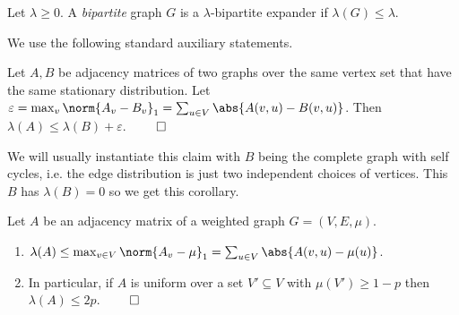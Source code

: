 \begin{definition}
    Let \(\lambda \geq 0\). A \emph{bipartite} graph \(G\) is a \(\lambda\)-bipartite expander if \(\lambda(G) \leq \lambda\).
\end{definition}


We use the following standard auxiliary statements.
\begin{claim} \label{claim:close-distance}
    Let \(A,B\) be adjacency matrices of two graphs over the same vertex set that have the same stationary distribution. Let \(\varepsilon = \max_{v} \norm{A_v - B_v}_1 = \sum_{u \in V} \abs{A(v,u) - B(v,u)}\). Then \(\lambda(A) \leq \lambda(B) + \varepsilon\). \(\qed\)
\end{claim}


We will usually instantiate this claim with \(B\) being the complete graph with self cycles, i.e. the edge distribution is just two independent choices of vertices. This \(B\) has \(\lambda(B) = 0\) so we get this corollary.
\begin{corollary} \label{cor:closeness-to-uniform}
    Let \(A\) be an adjacency matrix of a weighted graph \(G=(V,E,\mu)\).
    \begin{enumerate}
        \item \(\lambda(A) \leq \max_{v \in V} \norm{A_v - \mu}_1 = \sum_{u \in V} \abs{A(v,u) - \mu(u)}\).
        \item In particular, if \(A\) is uniform over a set \(V' \subseteq V\) with \(\mu(V') \geq 1-p\) then \(\lambda(A) \leq 2p\). \(\qed\)
    \end{enumerate}
\end{corollary}


